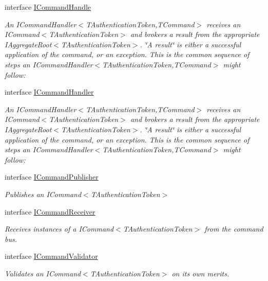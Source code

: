 \begin{DoxyCompactItemize}
interface \hyperlink{interfaceCqrs_1_1Commands_1_1ICommandHandle}{I\+Command\+Handle}
\begin{DoxyCompactList}\small\item\em An I\+Command\+Handler$<$\+T\+Authentication\+Token,\+T\+Command$>$ receives an I\+Command$<$\+T\+Authentication\+Token$>$ and brokers a result from the appropriate I\+Aggregate\+Root$<$\+T\+Authentication\+Token$>$. \char`\"{}\+A result\char`\"{} is either a successful application of the command, or an exception. This is the common sequence of steps an I\+Command\+Handler$<$\+T\+Authentication\+Token,\+T\+Command$>$ might follow\+: \end{DoxyCompactList}\item 
interface \hyperlink{interfaceCqrs_1_1Commands_1_1ICommandHandler}{I\+Command\+Handler}
\begin{DoxyCompactList}\small\item\em An I\+Command\+Handler$<$\+T\+Authentication\+Token,\+T\+Command$>$ receives an I\+Command$<$\+T\+Authentication\+Token$>$ and brokers a result from the appropriate I\+Aggregate\+Root$<$\+T\+Authentication\+Token$>$. \char`\"{}\+A result\char`\"{} is either a successful application of the command, or an exception. This is the common sequence of steps an I\+Command\+Handler$<$\+T\+Authentication\+Token,\+T\+Command$>$ might follow\+: \end{DoxyCompactList}\item 
interface \hyperlink{interfaceCqrs_1_1Commands_1_1ICommandPublisher}{I\+Command\+Publisher}
\begin{DoxyCompactList}\small\item\em Publishes an I\+Command$<$\+T\+Authentication\+Token$>$ \end{DoxyCompactList}\item 
interface \hyperlink{interfaceCqrs_1_1Commands_1_1ICommandReceiver}{I\+Command\+Receiver}
\begin{DoxyCompactList}\small\item\em Receives instances of a I\+Command$<$\+T\+Authentication\+Token$>$ from the command bus. \end{DoxyCompactList}\item 
interface \hyperlink{interfaceCqrs_1_1Commands_1_1ICommandValidator}{I\+Command\+Validator}
\begin{DoxyCompactList}\small\item\em Validates an I\+Command$<$\+T\+Authentication\+Token$>$ on its own merits. \end{DoxyCompactList}\item 

\end{DoxyCompactItemize}
